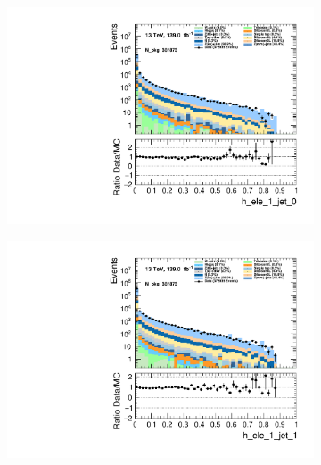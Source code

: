 \begin{figure}
\begin{subfigure}{.49\textwidth}
        \includegraphics[width=\textwidth]{Figures/MC_Data_comp/h_ele_1_jet_0.pdf}
        \caption{ }
        \label{fig:fep}
    \end{subfigure}
    \hfill
    \begin{subfigure}{.49\textwidth}
        \includegraphics[width=\textwidth]{Figures/MC_Data_comp/h_ele_1_jet_1.pdf}
        \caption{ }
        \label{fig:fe}
    \end{subfigure}
    \hfill       
    \caption{}
    \label{fig:t}
\end{figure}

